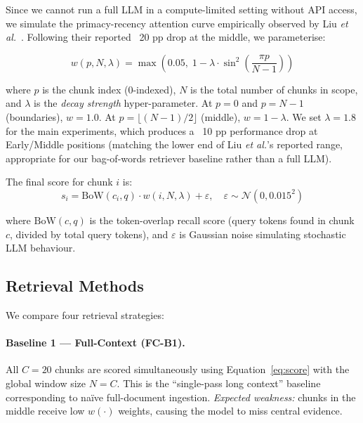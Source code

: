 \documentclass[sigconf,nonacm]{acmart}
\begin{document}
Since we cannot run a full LLM in a compute-limited setting without API access,
we simulate the primacy-recency attention curve empirically observed by
Liu \emph{et al.}~\cite{liu2023lost}.
Following their reported ~20 pp drop at the middle, we parameterise:

\begin{equation}
  w(p, N, \lambda) = \max\!\left(0.05,\; 1 - \lambda \cdot \sin^2\!\!\left(\frac{\pi p}{N-1}\right)\right)
  \label{eq:attn}
\end{equation}

\noindent where $p$ is the chunk index (0-indexed), $N$ is the total number of
chunks in scope, and $\lambda$ is the \emph{decay strength} hyper-parameter.
At $p = 0$ and $p = N-1$ (boundaries), $w = 1.0$.
At $p = \lfloor(N-1)/2\rfloor$ (middle), $w = 1 - \lambda$.
We set $\lambda = 1.8$ for the main experiments, which produces a ~10 pp
performance drop at Early/Middle positions (matching the lower end of Liu \emph{et al.}'s
reported range, appropriate for our bag-of-words retriever baseline rather than
a full LLM).

The final score for chunk $i$ is:
\begin{equation}
  s_i = \text{BoW}(c_i, q) \cdot w(i, N, \lambda) + \varepsilon, \quad \varepsilon \sim \mathcal{N}(0, 0.015^2)
  \label{eq:score}
\end{equation}

\noindent where $\text{BoW}(c, q)$ is the token-overlap recall score
(query tokens found in chunk $c$, divided by total query tokens), and $\varepsilon$
is Gaussian noise simulating stochastic LLM behaviour.

\subsection{Retrieval Methods}
\label{sec:methods-detail}

We compare four retrieval strategies:

\paragraph{Baseline 1 — Full-Context (FC-B1).}
All $C = 20$ chunks are scored simultaneously using Equation~\ref{eq:score} with the
global window size $N = C$.
This is the ``single-pass long context'' baseline corresponding to naïve full-document
ingestion.
\emph{Expected weakness:} chunks in the middle receive low $w(\cdot)$ weights,
causing the model to miss central evidence.
\end{document}
